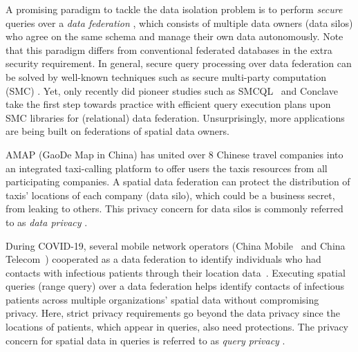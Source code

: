 A promising paradigm to tackle the data isolation problem is to perform \textit{secure} queries over a \textit{data federation} \cite{vldb17smcql}, which consists of multiple data owners (\aka data silos) who agree on the same schema and manage their own data autonomously. 
Note that this paradigm differs from conventional federated databases \cite{DBLP:books/sp/OzsuV20} in the extra security requirement.
In general, secure query processing over data federation can be solved by well-known techniques such as secure multi-party computation (SMC) \cite{DBLP:journals/ftsec/EvansKR18}.
Yet, only recently did pioneer studies such as SMCQL~\cite{vldb17smcql} and Conclave~\cite{eurosys19conclave} take the first step towards practice with efficient query execution plans upon SMC libraries for (relational) data federation.
Unsurprisingly, more applications are being built on federations of spatial data owners.

\begin{example}
AMAP \cite{AMAP} (GaoDe Map in China) has united over $8$ Chinese travel companies into an integrated taxi-calling platform to offer users the taxis resources from all participating companies.
A spatial data federation can protect the distribution of taxis' locations of each company (\ie data silo), which could be a business secret, from leaking to others.
This privacy concern for data silos is commonly referred to as \textit{data privacy} \cite{DBLP:reference/dbsec/2008}.
\end{example}

\begin{example}
During COVID-19, several mobile network operators (\eg China Mobile~\cite{chinamobile} and China Telecom~\cite{chinatelecom}) cooperated as a data federation to identify individuals who had contacts with infectious patients through their location data~\cite{contact}.
Executing spatial queries (\eg range query) over a data federation helps identify contacts of infectious patients across multiple organizations' spatial data without compromising privacy.
Here, strict privacy requirements go beyond the data privacy since the locations of patients, which appear in queries, also need protections.
The privacy concern for spatial data in queries is referred to as \textit{query privacy} \cite{DBLP:reference/dbsec/2008}.
\end{example}


